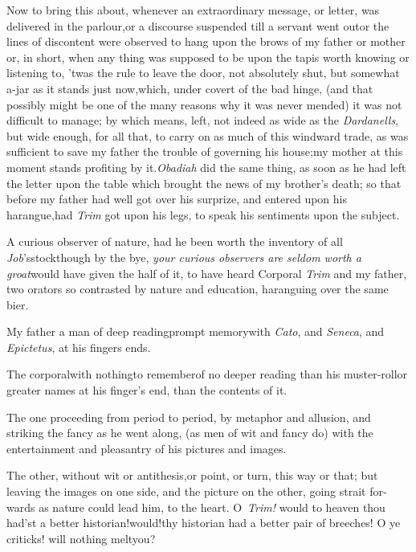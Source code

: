 \documentclass{article}
\begin{document}
Now to bring this about, whenever an extraordinary message, or
letter, was delivered in the parlour,\tsk or a discourse suspended
till a servant went out\tsk or the lines of discontent were
observed to hang upon the brows of my father or mother\break
\tsk or, in short, when any thing was supposed to be upon
the tapis worth knowing or listening to, ’twas the rule to
leave the door, not absolutely shut, but somewhat a-jar\tsk
as it stands just now,\tsk which, under covert of the bad
hinge, (and that possibly might be one of the many reasons
why it was never mended) it was not difficult to manage; by
which means,
left, not indeed as wide as the \textit{Dardanells}, but
wide enough, for all that, to carry on as much of this
windward trade, as was sufficient to save my father the
trouble of governing his house;\tsk my mother at this moment
stands profiting by it.\tsk \textit{Obadiah} did the same
thing, as soon as he had left the letter upon the table
which brought the news of my brother’s death; so that before
my father had well got over his surprize, and entered upon
his harangue,\tsk had \textit{Trim} got upon his legs, to
speak his sentiments upon the subject.

A curious observer of nature, had he been worth the inventory of
all \textit{Job}’s\break stock\tsk though by the bye, \textit{your
curious observers are seldom worth a groat}\tsk would have
given the half of it, to have heard Corporal \textit{Trim} and my
father, two orators so contrasted by nature and education,
haranguing over the same bier.

My father a man of deep reading\tsk prompt
memory\tsk with \textit{Cato}, and \textit{Seneca}, and
\textit{Epictetus}, at his fingers ends.\tsk

The corporal\tsk with nothing\tsk to remember\tsk of no
deeper reading than his muster-roll\tsk or greater names at his
finger’s end, than the contents of it.

The one proceeding from period to period, by metaphor and
allusion, and striking the fancy as he went along, (as men
of wit and fancy do) with the entertainment and pleasantry
of his pictures and images.

The other, without wit or antithesis,\break or point, or turn,
this way or that; but leaving the images on one side, and
the picture on the other, going strait for-\break wards as nature
could lead him, to the heart. O~\textit{Trim!} would to
heaven thou had’st a better historian!\tsk would!\tsk thy
historian had a better pair of breeches!
\setlength{\baselineskip}{12.7826pt}%
\tsh O ye criticks! will nothing melt\break you?
\end{document}
